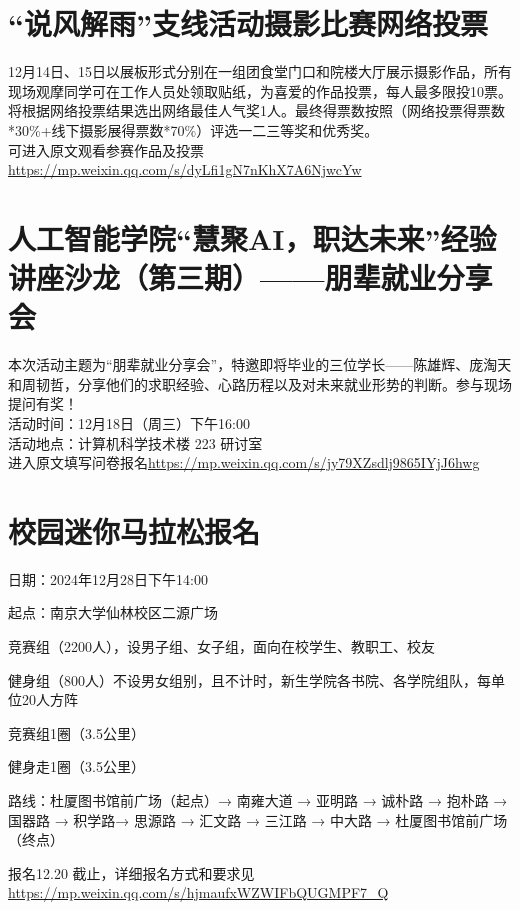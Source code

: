 \documentclass[letterpaper, 12pt]{article}
\begin{document}
\begin{multicols}{2}
\section{“说风解雨”支线活动摄影比赛网络投票}
12月14日、15日以展板形式分别在一组团食堂门口和院楼大厅展示摄影作品，所有现场观摩同学可在工作人员处领取贴纸，为喜爱的作品投票，每人最多限投10票。\\
将根据网络投票结果选出网络最佳人气奖1人。最终得票数按照（网络投票得票数*30\%+线下摄影展得票数*70\%）评选一二三等奖和优秀奖。\\
可进入原文观看参赛作品及投票\url{https://mp.weixin.qq.com/s/dyLfi1gN7nKhX7A6NjwcYw}


\section{人工智能学院“慧聚AI，职达未来”经验讲座沙龙（第三期）——朋辈就业分享会}
本次活动主题为“朋辈就业分享会”，特邀即将毕业的三位学长——陈雄辉、庞淘天和周韧哲，分享他们的求职经验、心路历程以及对未来就业形势的判断。参与现场提问有奖！\\
活动时间：12月18日（周三）下午16:00\\
活动地点：计算机科学技术楼 223 研讨室\\
进入原文填写问卷报名\url{https://mp.weixin.qq.com/s/jy79XZsdlj9865IYjJ6hwg}

\section{校园迷你马拉松报名}
日期：2024年12月28日下午14:00

起点：南京大学仙林校区二源广场

竞赛组（2200人），设男子组、女子组，面向在校学生、教职工、校友

健身组（800人）不设男女组别，且不计时，新生学院各书院、各学院组队，每单位20人方阵

竞赛组1圈（3.5公里）

健身走1圈（3.5公里）

路线：杜厦图书馆前广场（起点）→ 南雍大道 → 亚明路 →  诚朴路 → 抱朴路 → 国器路 → 积学路→ 思源路 → 汇文路 → 三江路 → 中大路 → 杜厦图书馆前广场（终点）

报名12.20 截止，详细报名方式和要求见\url{https://mp.weixin.qq.com/s/hjmaufxWZWIFbQUGMPF7_Q}
\end{multicols}
\end{document}
